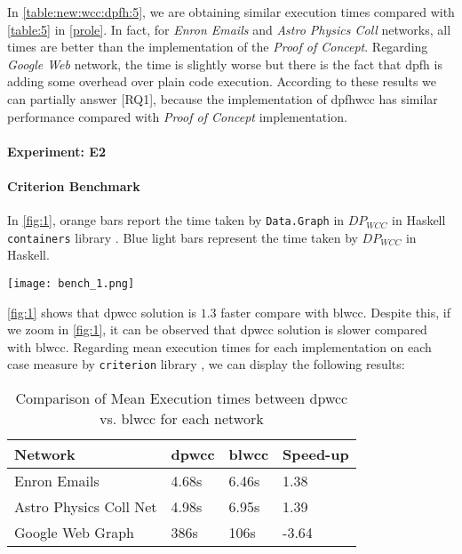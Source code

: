 In \autoref{table:new:wcc:dpfh:5}, we are obtaining similar execution times compared with \autoref{table:5} in \autoref{prole}.
In fact, for \textit{Enron Emails} and \textit{Astro Physics Coll} networks, all times are better than the implementation of the \textit{Proof of Concept}.
Regarding \textit{Google Web} network, the time is slightly worse but there is the fact that \acrshort{dpfh} is adding some overhead over plain code execution.
According to these results we can partially answer [RQ1], because the implementation of \acrshort{dpfhwcc} has similar performance compared with \textit{Proof of Concept} implementation. 

\paragraph{Experiment: E2}\label{sub:new:exp:2}
\paragraph{Criterion Benchmark}
In \autoref{fig:1}, orange bars report the time taken by \texttt{Data.Graph} in $DP_{WCC}$ in Haskell \texttt{containers} library \cite{containers}. Blue light bars represent the time taken by $DP_{WCC}$ in Haskell.

\begin{minipage}[t]{\linewidth}
  \texttt{[image: bench\_1.png]}
  \captionsetup{type=figure}
  \label{fig:1}
\end{minipage}

\autoref{fig:1} shows that \acrshort{dpwcc} solution is $1.3$ faster compare with \acrshort{blwcc}. 
Despite this, if we zoom  in \autoref{fig:1}, it can be observed that \acrshort{dpwcc} solution is slower compared with \acrshort{blwcc}.
Regarding mean execution times for each implementation on each case measure by \texttt{criterion} library \cite{criterion}, we can display the following results:

\begin{table}[H]
  \centering
  \begin{tabular}{|l|l|l|l|}
   \hline
   \textbf{Network} & \textbf{\acrshort{dpwcc}} & \textbf{\acrshort{blwcc}} & \textbf{Speed-up}\\
   \hline
   Enron Emails & 4.68s &  6.46s & 1.38\\
   \hline
   Astro Physics Coll Net & 4.98s & 6.95s  & 1.39\\
   \hline
   Google Web Graph & 386s & 106s & -3.64\\
   \hline
  \end{tabular}
 \caption{Comparison of Mean Execution times between \acrshort{dpwcc} vs. \acrshort{blwcc} for each network}
 \label{table:6}
 \end{table}

